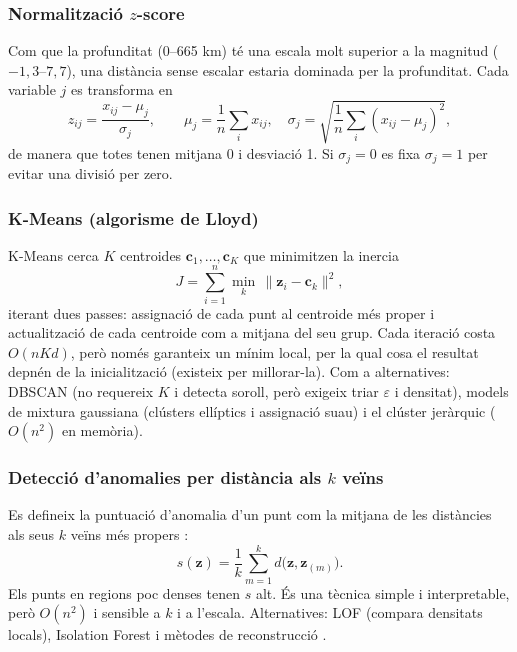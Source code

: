 \documentclass[a4paper,11pt]{article}
\providecommand{\py}[1]{\texttt{\detokenize{#1}}}
\begin{document}
\subsubsection{Normalitzaci\'o $z$-score}
Com que la profunditat (0--665 km) t\'e una escala molt superior a la magnitud ($-1{,}3$--$7{,}7$), una dist\`ancia sense escalar estaria dominada per la profunditat. Cada variable $j$ es transforma en
\begin{equation}
z_{ij}=\frac{x_{ij}-\mu_j}{\sigma_j},\qquad \mu_j=\frac1n\sum_i x_{ij},\quad \sigma_j=\sqrt{\frac1n\sum_i (x_{ij}-\mu_j)^2},
\end{equation}
de manera que totes tenen mitjana 0 i desviaci\'o 1. Si $\sigma_j=0$ es fixa $\sigma_j=1$ per evitar una divisi\'o per zero.

\subsubsection{K-Means (algorisme de Lloyd)}
K-Means \cite{lloyd,macqueen} cerca $K$ centroides $\mathbf c_1,\dots,\mathbf c_K$ que minimitzen la inercia
\begin{equation}
J=\sum_{i=1}^{n}\min_{k}\,\lVert \mathbf z_i-\mathbf c_k\rVert^2 ,
\end{equation}
iterant dues passes: assignaci\'o de cada punt al centroide m\'es proper i actualitzaci\'o de cada centroide com a mitjana del seu grup. Cada iteraci\'o costa $O(nKd)$, per\`o nom\'es garanteix un m\'inim local, per la qual cosa el resultat depn\'en de la inicialitzaci\'o (existeix \py{k-means++} \cite{kmpp} per millorar-la). Com a alternatives: DBSCAN (no requereix $K$ i detecta soroll, per\`o exigeix triar $\varepsilon$ i densitat), models de mixtura gaussiana (cl\'usters el\textperiodcentered l\'iptics i assignaci\'o suau) i el cl\'uster jer\`arquic ($O(n^2)$ en mem\`oria).

\subsubsection{Detecci\'o d'anomalies per dist\`ancia als $k$ ve\"ins}
Es defineix la puntuaci\'o d'anomalia d'un punt com la mitjana de les dist\`ancies als seus $k$ ve\"ins m\'es propers \cite{ramaswamy}:
\begin{equation}
s(\mathbf z)=\frac1k\sum_{m=1}^{k} d\bigl(\mathbf z,\mathbf z_{(m)}\bigr).
\end{equation}
Els punts en regions poc denses tenen $s$ alt. \'Es una t\`ecnica simple i interpretable, per\`o $O(n^2)$ i sensible a $k$ i a l'escala. Alternatives: LOF (compara densitats locals), Isolation Forest i m\`etodes de reconstrucci\'o \cite{chandola}.
\end{document}
